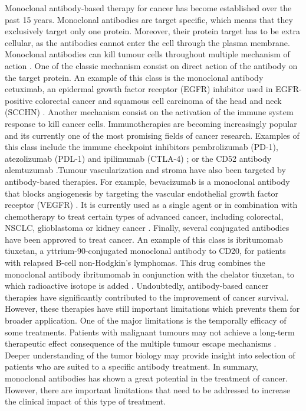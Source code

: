 \documentclass[11pt, b5paper,twoside]{tesi_upf}
\begin{document}
\par  Monoclonal antibody-based therapy for cancer has become established over the past 15 years. Monoclonal antibodies are target specific, which means that they exclusively target only one protein. Moreover, their protein target has to be extra cellular, as the antibodies cannot enter the cell through the plasma membrane. Monoclonal antibodies can kill tumour cells throughout multiple mechanism of action \cite{Scott2012}. One of the classic mechanism consist on direct action of the antibody on the target protein. An example of this class is the monoclonal antibody cetuximab, an epidermal growth factor receptor (EGFR) inhibitor used in EGFR-positive colorectal cancer \cite{Jonker2007} and squamous cell carcinoma of the head and neck (SCCHN) \cite{Tejani2010}. Another mechanism consist on the activation of the immune system response to kill cancer cells. Immunotherapies are becoming increasingly popular and its currently one of the most promising fields of cancer research.  Examples of this class include the immune checkpoint inhibitors  pembrolizumab (PD-1), atezolizumab (PDL-1) and ipilimumab (CTLA-4) \cite{Postow2015}; or the CD52 antibody alemtuzumab \cite{Demko2008}.Tumour vascularization and stroma have also been targeted by antibody-based therapies. For example, bevacizumab is a monoclonal antibody that blocks angiogenesis by targeting the vascular endothelial growth factor receptor (VEGFR) \cite{Ferrara2004}. It is currently used as a single agent or in combination with chemotherapy to treat certain types of advanced cancer, including colorectal, NSCLC, glioblastoma or kidney cancer \cite{Keating2014}. Finally, several conjugated antibodies have been approved to treat cancer. An example of this class is ibritumomab tiuxetan, a yttrium-90-conjugated monoclonal antibody to CD20, for patients with relapsed B-cell non-Hodgkin's lymphomas. This drug combines the monoclonal antibody ibritumomab in conjunction with the chelator tiuxetan, to which radioactive isotope is added \cite{Witzig2002}. Undoubtedly, antibody-based cancer therapies have significantly contributed to the improvement of cancer survival. However, these therapies have still important limitations which prevents them for broader application. One of the major limitations is the temporally efficacy of some treatments. Patients with malignant tumours may not achieve a long-term therapeutic effect consequence of the multiple tumour escape mechanisms \cite{Scott2012}. Deeper understanding of the tumor biology may provide insight into selection of patients who are suited to a specific antibody treatment. In summary, monoclonal antibodies has shown a great potential in the treatment of cancer. However, there are important limitations that need to be addressed to increase the clinical impact of this type of treatment.  
\end{document}
